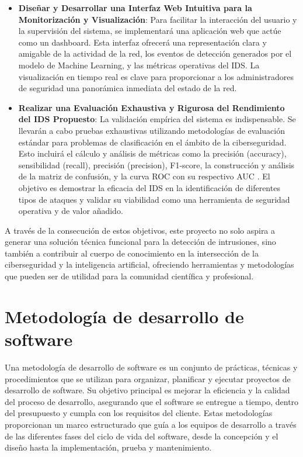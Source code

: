 \begin{itemize}
    \item\textbf{Diseñar y Desarrollar una Interfaz Web Intuitiva para la Monitorización y Visualización}: Para facilitar la interacción del usuario y la supervisión del sistema, se implementará una aplicación web que actúe como un dashboard. Esta interfaz ofrecerá una representación clara y amigable de la actividad de la red, los eventos de detección generados por el modelo de Machine Learning, y las métricas operativas del IDS. La visualización en tiempo real es clave para proporcionar a los administradores de seguridad una panorámica inmediata del estado de la red.
    
    \item\textbf{Realizar una Evaluación Exhaustiva y Rigurosa del Rendimiento del IDS Propuesto}: La validación empírica del sistema es indispensable. Se llevarán a cabo pruebas exhaustivas utilizando metodologías de evaluación estándar para problemas de clasificación en el ámbito de la ciberseguridad. Esto incluirá el cálculo y análisis de métricas como la precisión (accuracy), sensibilidad (recall), precisión (precision), F1-score, la construcción y análisis de la matriz de confusión, y la curva ROC con su respectivo AUC \cite{PolaniaArias2021EvaluacionMLIDS}. El objetivo es demostrar la eficacia del IDS en la identificación de diferentes tipos de ataques y validar su viabilidad como una herramienta de seguridad operativa y de valor añadido.
 
\end{itemize}

A través de la consecución de estos objetivos, este proyecto no solo aspira a generar una solución técnica funcional para la detección de intrusiones, sino también a contribuir al cuerpo de conocimiento en la intersección de la ciberseguridad y la inteligencia artificial, ofreciendo herramientas y metodologías que pueden ser de utilidad para la comunidad científica y profesional.

\section{Metodología de desarrollo de software}
Una metodología de desarrollo de software es un conjunto de prácticas,
técnicas y procedimientos que se utilizan para organizar, planificar y ejecutar proyectos de desarrollo de software. Su objetivo principal es mejorar la eficiencia y la calidad del proceso de desarrollo, asegurando que el software se entregue a tiempo, dentro del presupuesto y cumpla con los requisitos del cliente. Estas metodologías proporcionan un marco estructurado que guía a los equipos de desarrollo a través de las diferentes fases del ciclo de vida del software, desde la concepción y el diseño hasta la implementación, prueba y mantenimiento.

